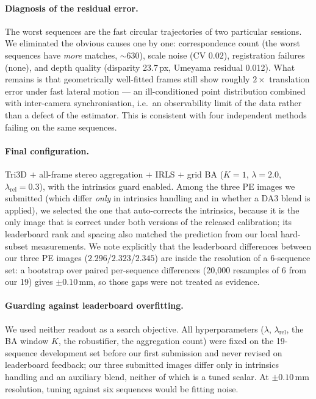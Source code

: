 \paragraph{Diagnosis of the residual error.} The worst sequences are the fast circular trajectories of two
particular sessions. We eliminated the obvious causes one by one: correspondence count (the worst
sequences have \emph{more} matches, $\sim$630), scale noise (CV $0.02$), registration failures (none), and
depth quality (disparity 23.7\,px, Umeyama residual 0.012). What remains is that geometrically well-fitted
frames still show roughly $2\times$ translation error under fast lateral motion --- an ill-conditioned
point distribution combined with inter-camera synchronisation, i.e.\ an observability limit of the data
rather than a defect of the estimator. This is consistent with four independent methods failing on the
same sequences.

\paragraph{Final configuration.} Tri3D $+$ all-frame stereo aggregation $+$ IRLS $+$ grid BA
($K=1$, $\lambda=2.0$, $\lambda_{\mathrm{rel}}=0.3$), with the intrinsics guard enabled. Among the three
PE images we submitted (which differ \emph{only} in intrinsics handling and in whether a DA3 blend is
applied), we selected the one that auto-corrects the intrinsics, because it is the only image that is
correct under both versions of the released calibration; its leaderboard rank and spacing also matched the
prediction from our local hard-subset measurements. We note explicitly that the leaderboard differences
between our three PE images ($2.296$/$2.323$/$2.345$) are inside the resolution of a 6-sequence set: a
bootstrap over paired per-sequence differences (20{,}000 resamples of 6 from our 19) gives $\pm 0.10$\,mm,
so those gaps were not treated as evidence.

\paragraph{Guarding against leaderboard overfitting.} We used neither readout as a search objective. All
hyperparameters ($\lambda$, $\lambda_{\mathrm{rel}}$, the BA window $K$, the robustifier, the aggregation
count) were fixed on the 19-sequence development set before our first submission and never revised on
leaderboard feedback; our three submitted images differ only in intrinsics handling and an auxiliary blend,
neither of which is a tuned scalar. At $\pm 0.10$\,mm resolution, tuning against six sequences would be
fitting noise.

